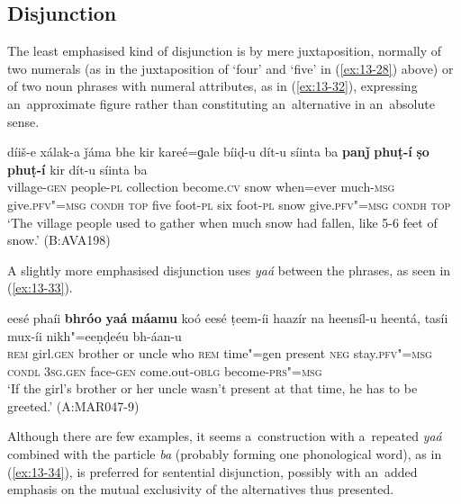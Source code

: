 \subsection{Disjunction}
\label{subsec:13-2-3}

 The least emphasised kind of disjunction is by mere juxtaposition, normally of two numerals (as in the juxtaposition of `four' and `five' in (\ref{ex:13-28}) above) or of two noun phrases with numeral attributes, as in (\ref{ex:13-32}), expressing an~approximate figure rather than constituting an~alternative in an~absolute sense.

\begin{exe}
\ex
\label{ex:13-32}
\gll díiš-e xálak-a ǰáma bhe kir kareé=ɡale bíiḍ-u dít-u síinta ba \textbf{panǰ} \textbf{phuṭ-í} \textbf{ṣo} \textbf{phuṭ-í} kir dít-u síinta ba\\
village-\textsc{gen} people-\textsc{pl} collection become.\textsc{cv} snow  when=ever much-\textsc{msg} give.\textsc{pfv"=msg} \textsc{condh} \textsc{top} five  foot-\textsc{pl} six foot-\textsc{pl} snow give.\textsc{pfv"=msg} \textsc{condh} \textsc{top} \\
\glt `The village people used to gather when much snow had fallen, like 5-6 feet of snow.' (B:AVA198) 
\end{exe}

 A slightly more emphasised disjunction uses \textit{yaá} between the phrases, as seen in (\ref{ex:13-33}).

\begin{exe}
\ex
\label{ex:13-33}
\gll eesé phaíi \textbf{bhróo} \textbf{yaá} \textbf{máamu} koó eesé ṭeem-íi haazír na heensíl-u heentá, tasíi mux-íi nikh"=eeṇḍeéu bh-áan-u \\
\textsc{rem} girl.\textsc{gen} brother or uncle who \textsc{rem} time"=gen  present \textsc{neg} stay.\textsc{pfv"=msg} \textsc{condl} \textsc{3sg.gen} face-\textsc{gen}  come.out-\textsc{oblg} become-\textsc{prs"=msg}  \\
\glt `If the girl's brother or her uncle wasn't present at that time, he has to be greeted.' (A:MAR047-9) 
\end{exe}

 Although there are few examples, it seems a~construction with a~repeated \textit{yaá} combined with the particle \textit{ba} (probably forming one phonological word), as in (\ref{ex:13-34}), is preferred for sentential disjunction, possibly with an~added emphasis on the mutual exclusivity of the alternatives thus presented. 

